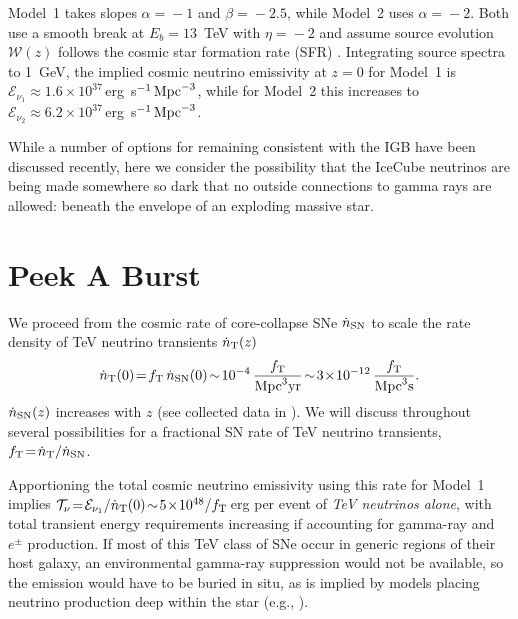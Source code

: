 \documentclass[aps,prd,nofootinbib,twocolumn,floatfix,letterpaper,superscriptaddress,showpacs]{revtex4}
\begin{document}
Model~1 takes slopes $\alpha \!=\! -1$ and $\beta \!=\! -2.5$, while Model~2 uses $\alpha \!=\! -2$.  Both use a smooth break at $E_b \!=\! 13$~TeV with $\eta \!=\! -2$ and assume source evolution $\mathcal{W}(z)$ follows the cosmic star formation rate (SFR) \cite{Hopkins2006,Yuksel2008,Kistler:2011yk,Kistler2013b}.
Integrating source spectra to 1~GeV, the implied cosmic neutrino emissivity at $z \!=\! 0$ for Model~1 is $\mathcal{E}_{\nu_1} \!\approx\! 1.6 \!\times\! 10^{37}\,$erg~s$^{-1}\,{\rm Mpc}^{-3}$, while for Model~2 this increases to $\mathcal{E}_{\nu_2} \!\approx\! 6.2 \!\times\! 10^{37}\,$erg~s$^{-1}\,{\rm Mpc}^{-3}$.

While a number of options for remaining consistent with the IGB have been discussed recently, here we consider the possibility that the IceCube neutrinos are being made somewhere so dark that no outside connections to gamma rays are allowed: beneath the envelope of an exploding massive star.



\section{Peek A Burst}
\label{burst}
%
We proceed from the cosmic rate of core-collapse SNe $\dot{n}_{\rm SN}$ to scale the rate density of TeV neutrino transients $\dot{n}_{\rm T}(z)$
%
\begin{equation}
       \dot{n}_{\rm T}(0) \!=\! f_{\rm T}\, \dot{n}_{\rm SN}(0) \!\sim\! 10^{-4}\,\frac{f_{\rm T}}{{\rm Mpc}^{3}{\rm yr}}
         \!\sim\! 3 \!\times\! 10^{-12}\,\frac{f_{\rm T}}{{\rm Mpc}^{3}{\rm s}}
    .
\label{nSN}
\end{equation}
%
$\dot{n}_{\rm SN}(z)$ increases with $z$ (see collected data in \cite{Yuksel:2012zy,Horiuchi:2011zz}).  We will discuss throughout several possibilities for a fractional SN rate of TeV neutrino transients, $f_{\rm T} \!=\! \dot{n}_{\rm T}/\dot{n}_{\rm SN}$.

Apportioning the total cosmic neutrino emissivity using this rate for Model~1 implies $\mathcal{T}_\nu \!=\! \mathcal{E}_{\nu_1}/\dot{n}_{\rm T}(0) \!\sim\! 5 \!\times\! 10^{48}/f_{\rm T}\,$erg per event of {\it TeV neutrinos alone}, with total transient energy requirements increasing if accounting for gamma-ray and $e^\pm$ production.
If most of this TeV class of SNe occur in generic regions of their host galaxy, an environmental gamma-ray suppression \cite{Kistler2015c,Kistler2015b} would not be available, so the emission would have to be buried in situ, as is implied by models placing neutrino production deep within the star (e.g., \cite{Meszaros:2001ms,Razzaque2004,Ando2005,Horiuchi2008,Enberg:2008jm,Bhattacharya:2014sta,Tamborra:2015fzv}).
\end{document}
